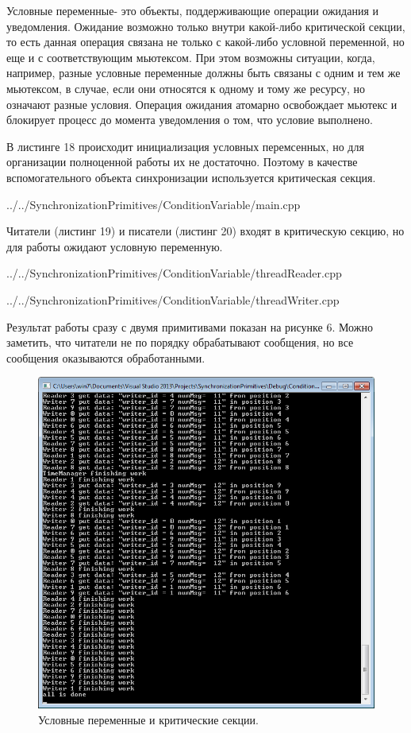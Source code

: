 \documentclass[a4paper, 12pt]{article}		%
\begin{document}
Условные переменные- это объекты, поддерживающие операции ожидания и уведомления. Ожидание возможно только внутри какой-либо критической секции, то есть данная операция связана не только с какой-либо условной переменной, но еще и с соответствующим мьютексом. При этом возможны ситуации, когда, например, разные условные переменные должны быть связаны с одним и тем же мьютексом, в случае, если они относятся к одному и тому же ресурсу, но означают разные условия. Операция ожидания атомарно освобождает мьютекс и блокирует процесс до момента уведомления о том, что условие выполнено.

В листинге 18 происходит инициализация условных перемсенных, но для организации полноценной работы их не достаточно. Поэтому в качестве вспомогательного объекта синхронизации используется критическая секция.


{../../SynchronizationPrimitives/ConditionVariable/main.cpp}

Читатели (листинг 19) и писатели (листинг 20) входят в критическую секцию, но для работы ожидают условную переменную.


{../../SynchronizationPrimitives/ConditionVariable/threadReader.cpp}


{../../SynchronizationPrimitives/ConditionVariable/threadWriter.cpp}
\newpage

Результат работы сразу с двумя примитивами показан на рисунке 6. Можно заметить, что читатели не по порядку обрабатывают сообщения, но все сообщения оказываются обработанными.

\begin{figure}[h!]
\centering
\includegraphics[scale=1]{res/005}
\caption{Условные переменные и критические секции.}
\end{figure}
\end{document}
